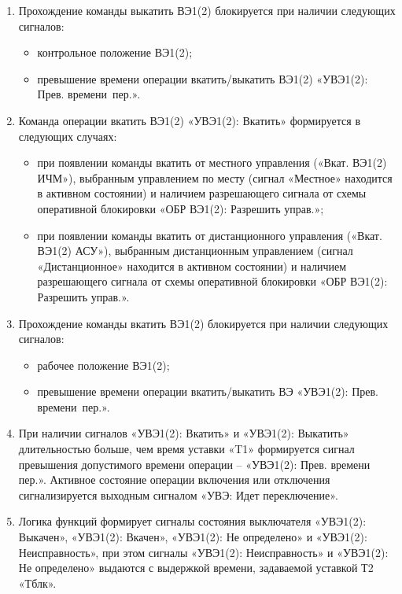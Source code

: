 \begin{enumerate}
\begin{enumerate}
\item
Прохождение команды выкатить ВЭ1(2) блокируется при наличии следующих сигналов:
\begin{itemize}
	\item контрольное положение ВЭ1(2);
	\item превышение времени операции вкатить/выкатить ВЭ1(2) «УВЭ1(2): Прев. времени~пер.».
\end{itemize}

\item
Команда операции вкатить ВЭ1(2) «УВЭ1(2): Вкатить» формируется в следующих случаях:
\begin{itemize}
	\item при появлении команды вкатить от местного управления («Вкат. ВЭ1(2) ИЧМ»), выбранным управлением по месту (сигнал «Местное» находится в активном состоянии) и наличием разрешающего сигнала от схемы оперативной блокировки «ОБР ВЭ1(2): Разрешить управ.»;
	\item при появлении команды вкатить от дистанционного управления («Вкат. ВЭ1(2) АСУ»), выбранным дистанционным управлением (сигнал «Дистанционное» находится в активном состоянии) и наличием разрешающего сигнала от схемы оперативной блокировки «ОБР ВЭ1(2): Разрешить управ.».
\end{itemize}

\item
Прохождение команды вкатить ВЭ1(2) блокируется при наличии следующих сигналов:
\begin{itemize}
	\item рабочее положение ВЭ1(2);
	\item превышение времени операции вкатить/выкатить ВЭ «УВЭ1(2): Прев. времени~пер.».
\end{itemize}

\item
При наличии сигналов «УВЭ1(2): Вкатить» и «УВЭ1(2): Выкатить» длительностью больше, чем время уставки «T1» формируется сигнал превышения допустимого времени операции -- «УВЭ1(2): Прев. времени пер.». Активное состояние операции включения или отключения сигнализируется выходным сигналом «УВЭ: Идет переключение».

\item
Логика функций формирует сигналы состояния выключателя «УВЭ1(2): Выкачен», «УВЭ1(2): Вкачен», «УВЭ1(2): Не определено» и «УВЭ1(2): Неисправность», при этом сигналы «УВЭ1(2): Неисправность» и «УВЭ1(2): Не определено» выдаются с выдержкой времени, задаваемой уставкой Т2 «Тблк».


\end{enumerate}
\end{enumerate}
